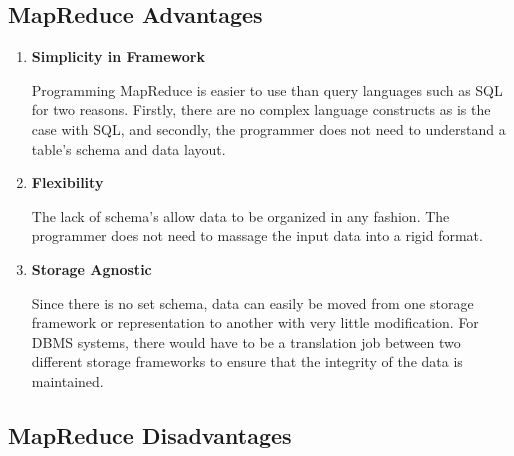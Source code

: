 \documentclass[10pt,twocolumn]{IEEEtran11}
\begin{document}
\subsection{MapReduce Advantages}

\begin {enumerate}
	\setlength\itemsep{1em}
	\item 
	
	\textbf{Simplicity in Framework}
	
	Programming MapReduce is easier to use than query languages such as SQL for two reasons.  Firstly, there are no complex language constructs as is the case with SQL, and secondly, the programmer does not need to understand a table's schema and data layout.
	\item 
	
	\textbf{Flexibility}
	
	The lack of schema's allow data to be organized in any fashion.  The programmer does not need to massage the input data into a rigid format.
	
	\item 
	
	\textbf{Storage Agnostic}
	
	Since there is no set schema, data can easily be moved from one storage framework or representation to another with very little modification.  
	For DBMS systems, there would have to be a translation job between two different storage frameworks to ensure that the integrity of the data is maintained.
	
\end {enumerate}

\subsection{MapReduce Disadvantages}
\end{document}
